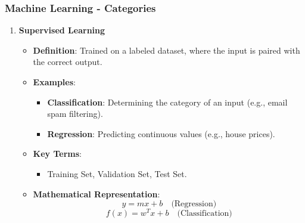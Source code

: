 \documentclass{beamer}
\begin{document}
\begin{frame}[fragile]
    \frametitle{Machine Learning - Categories}

    \begin{enumerate}
        \item \textbf{Supervised Learning}
            \begin{itemize}
                \item \textbf{Definition}: Trained on a labeled dataset, where the input is paired with the correct output.
                \item \textbf{Examples}:
                \begin{itemize}
                    \item \textbf{Classification}: Determining the category of an input (e.g., email spam filtering).
                    \item \textbf{Regression}: Predicting continuous values (e.g., house prices).
                \end{itemize}
                \item \textbf{Key Terms}:
                \begin{itemize}
                    \item Training Set, Validation Set, Test Set.
                \end{itemize}
                \item \textbf{Mathematical Representation}:
                \begin{equation}
                    y = mx + b \quad \text{(Regression)}
                \end{equation}
                \begin{equation}
                    f(x) = w^T x + b \quad \text{(Classification)}
                \end{equation}
            \end{itemize}
        

\end{enumerate}
\end{frame}
\end{document}
